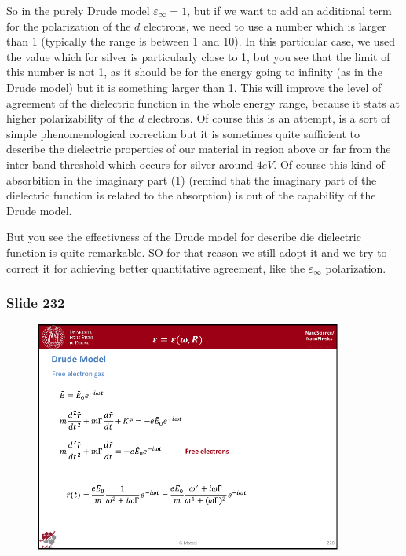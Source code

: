 \documentclass[../main/main.tex]{subfiles}
\begin{document}
So in the purely Drude model \( \varepsilon _ \infty =1 \), but if we want to add an additional term for the polarization of the \( d \) electrons, we need to use a number which is larger than 1 (typically the range is between 1 and 10). In this particular case, we used the value which for silver is particularly close to 1, but you see that the limit of this number is not 1, as it should be for the energy going to infinity (as in the Drude model) but it is something larger than 1. This will improve the level of agreement of the dielectric function in the whole energy range, because it stats at higher polarizability of the \( d \) electrons. Of course this is an attempt, is a sort of simple phenomenological correction but it is sometimes quite sufficient to describe the dielectric properties of our material in region above or far from the inter-band threshold which occurs for silver around \( 4eV \). Of course this kind of absorbition in the imaginary part (1) (remind that the imaginary part of the dielectric function is related to the absorption) is out of the capability of the Drude model.


But you see the effectivness of the Drude model for describe die dielectric function is quite remarkable. SO for that reason we still adopt it and we try to correct it for achieving better quantitative agreement, like the \( \varepsilon _ \infty  \) polarization.


\newpage

\subsubsection{Slide 232}

\begin{figure}[h!]
\centering
\includegraphics[page=5,width=0.9\textwidth]{../lessons/pdf_file/15_lesson.pdf}
\end{figure}
\end{document}
